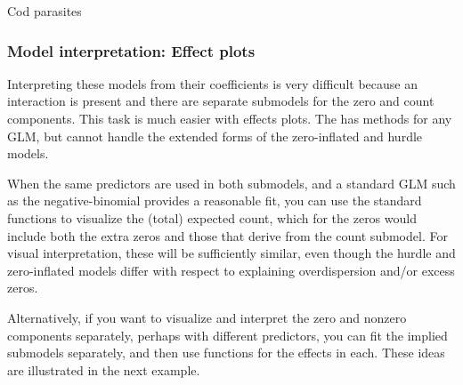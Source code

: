 \documentclass[11pt]{book}\usepackage[]{graphicx}\usepackage[]{color}
\begin{document}
\begin{Example}[cod2]{Cod parasites}
\end{Example}

\subsubsection{Model interpretation: Effect plots}

Interpreting these models from their coefficients is very difficult because an interaction
is present and there are separate submodels for the zero and count components.
This task is much easier with effects plots.
The  has methods for any GLM, but cannot handle the extended forms of
the zero-inflated and hurdle models.

When the same predictors are used in both
submodels, and a standard GLM such as the negative-binomial provides a reasonable
fit, you can use the standard  functions to visualize the (total)
expected count, which for the zeros would include both the extra zeros and
those that derive from the count submodel.  For visual interpretation, these will
be sufficiently similar, even though the hurdle and zero-inflated models differ
with respect to explaining overdispersion and/or excess zeros.

Alternatively, if you want to visualize and interpret the zero and nonzero components
separately, perhaps with different predictors, you can fit the implied submodels
separately, and then use  functions for the effects in each.
These ideas are illustrated in the next example.
\end{document}
